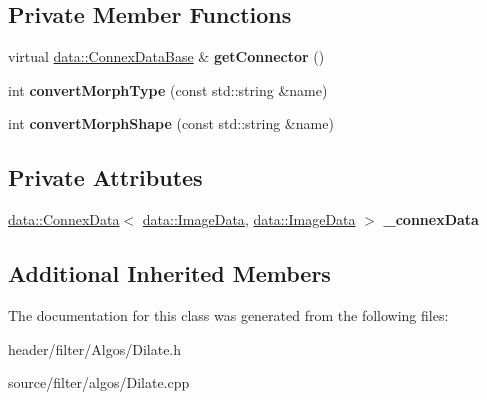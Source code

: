\subsection*{Private Member Functions}
\begin{DoxyCompactItemize}
\item 
\mbox{\label{classfilter_1_1algos_1_1_dilate_ac80c8dfc179c44362e7767687b598fb6}} 
virtual \hyperlink{classfilter_1_1data_1_1_connex_data_base}{data\+::\+Connex\+Data\+Base} \& {\bfseries get\+Connector} ()
\item 
\mbox{\label{classfilter_1_1algos_1_1_dilate_a2c645658ac94073fc0c7e2aace3c7510}} 
int {\bfseries convert\+Morph\+Type} (const std\+::string \&name)
\item 
\mbox{\label{classfilter_1_1algos_1_1_dilate_a6a6bb84eb8575fe818323553f72364d7}} 
int {\bfseries convert\+Morph\+Shape} (const std\+::string \&name)
\end{DoxyCompactItemize}
\subsection*{Private Attributes}
\begin{DoxyCompactItemize}
\item 
\mbox{\label{classfilter_1_1algos_1_1_dilate_aae0677e218e9b299d7fdaaad7f6b14db}} 
\hyperlink{classfilter_1_1data_1_1_connex_data}{data\+::\+Connex\+Data}$<$ \hyperlink{classfilter_1_1data_1_1_image_data}{data\+::\+Image\+Data}, \hyperlink{classfilter_1_1data_1_1_image_data}{data\+::\+Image\+Data} $>$ {\bfseries \+\_\+connex\+Data}
\end{DoxyCompactItemize}
\subsection*{Additional Inherited Members}


The documentation for this class was generated from the following files\+:\begin{DoxyCompactItemize}
\item 
header/filter/\+Algos/Dilate.\+h\item 
source/filter/algos/Dilate.\+cpp\end{DoxyCompactItemize}
